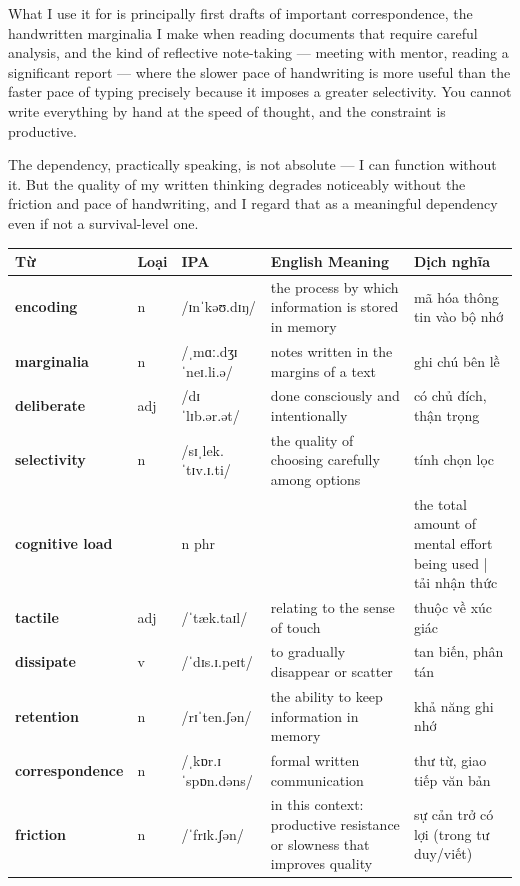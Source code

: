 \begin{ieltsanswer}
What I use it for is principally first drafts of important correspondence, the handwritten marginalia I make when reading documents that require careful analysis, and the kind of reflective note-taking — meeting with mentor, reading a significant report — where the slower pace of handwriting is more useful than the faster pace of typing precisely because it imposes a greater selectivity. You cannot write everything by hand at the speed of thought, and the constraint is productive.

The dependency, practically speaking, is not absolute — I can function without it. But the quality of my written thinking degrades noticeably without the friction and pace of handwriting, and I regard that as a meaningful dependency even if not a survival-level one.
\end{ieltsanswer}


\vspace{0.8em}
\begin{center}
\renewcommand{\arraystretch}{1.65}
\begin{tabularx}{\textwidth}{|V{0.22\textwidth}|C{0.07\textwidth}|I{0.20\textwidth}|Y|V{0.18\textwidth}|}
\hline
{}
\textbf{Từ} & \textbf{Loại} & \textbf{IPA} & \textbf{English Meaning} & \textbf{Dịch nghĩa} \\
\hline
\textbf{encoding} & n & /ɪnˈkəʊ.dɪŋ/ & the process by which information is stored in memory & mã hóa thông tin vào bộ nhớ \\ \hline
\textbf{marginalia} & n & /ˌmɑː.dʒɪˈneɪ.li.ə/ & notes written in the margins of a text & ghi chú bên lề \\ \hline
\textbf{deliberate} & adj & /dɪˈlɪb.ər.ət/ & done consciously and intentionally & có chủ đích, thận trọng \\ \hline
\textbf{selectivity} & n & /sɪˌlek.ˈtɪv.ɪ.ti/ & the quality of choosing carefully among options & tính chọn lọc \\ \hline
\textbf{cognitive load} & & n phr & & the total amount of mental effort being used | tải nhận thức \\ \hline
\textbf{tactile} & adj & /ˈtæk.taɪl/ & relating to the sense of touch & thuộc về xúc giác \\ \hline
\textbf{dissipate} & v & /ˈdɪs.ɪ.peɪt/ & to gradually disappear or scatter & tan biến, phân tán \\ \hline
\textbf{retention} & n & /rɪˈten.ʃən/ & the ability to keep information in memory & khả năng ghi nhớ \\ \hline
\textbf{correspondence} & n & /ˌkɒr.ɪˈspɒn.dəns/ & formal written communication & thư từ, giao tiếp văn bản \\ \hline
\textbf{friction} & n & /ˈfrɪk.ʃən/ & in this context: productive resistance or slowness that improves quality & sự cản trở có lợi (trong tư duy/viết) \\ \hline
\end{tabularx}
\end{center}

